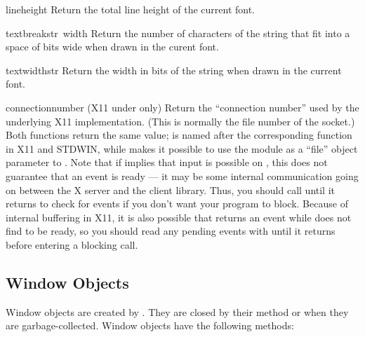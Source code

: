 \begin{funcdesc}{lineheight}{}
Return the total line height of the current font.
\end{funcdesc}

\begin{funcdesc}{textbreak}{str\, width}
Return the number of characters of the string that fit into a space of
bits wide when drawn in the curent font.
\end{funcdesc}

\begin{funcdesc}{textwidth}{str}
Return the width in bits of the string when drawn in the current font.
\end{funcdesc}

\begin{funcdesc}{connectionnumber}{}
(X11 under \UNIX{} only) Return the ``connection number'' used by the
underlying X11 implementation.  (This is normally the file number of
the socket.)  Both functions return the same value;
 is named after the corresponding function in
X11 and STDWIN, while  makes it possible to use the
 module as a ``file'' object parameter to
.  Note that if  implies that
input is possible on , this does not guarantee that an
event is ready --- it may be some internal communication going on
between the X server and the client library.  Thus, you should call
 until it returns  to check for
events if you don't want your program to block.  Because of internal
buffering in X11, it is also possible that 
returns an event while  does not find  to
be ready, so you should read any pending events with
 until it returns  before entering
a blocking  call.
\end{funcdesc}

\subsection{Window Objects}

Window objects are created by .  They are closed
by their  method or when they are garbage-collected.
Window objects have the following methods:


